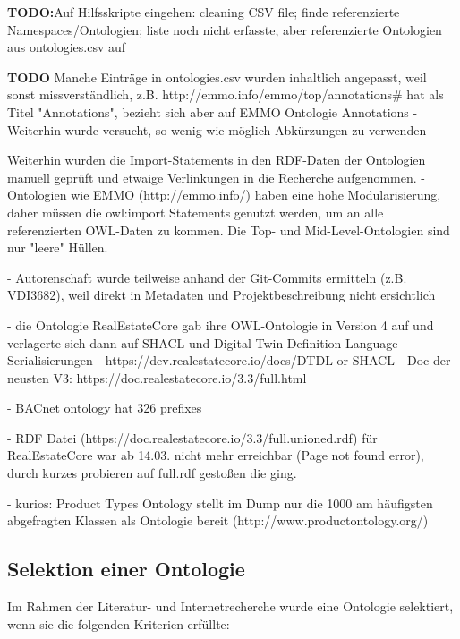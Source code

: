 \documentclass{article}
\begin{document}
\textbf{TODO:}Auf Hilfsskripte eingehen: cleaning CSV file; finde referenzierte Namespaces/Ontologien; liste noch nicht erfasste, aber referenzierte Ontologien aus ontologies.csv auf

\textbf{TODO} Manche Einträge in ontologies.csv wurden inhaltlich angepasst, weil sonst missverständlich, z.B. http://emmo.info/emmo/top/annotations\# hat als Titel "Annotations", bezieht sich aber auf EMMO Ontologie Annotations
- Weiterhin wurde versucht, so wenig wie möglich Abkürzungen zu verwenden

Weiterhin wurden die Import-Statements in den RDF-Daten der Ontologien manuell geprüft und etwaige Verlinkungen in die Recherche aufgenommen.
- Ontologien wie EMMO (http://emmo.info/) haben eine hohe Modularisierung, daher müssen die owl:import Statements genutzt werden, um an alle referenzierten OWL-Daten zu kommen. Die Top- und Mid-Level-Ontologien sind nur "leere" Hüllen.

- Autorenschaft wurde teilweise anhand der Git-Commits ermitteln (z.B. VDI3682), weil direkt in Metadaten und Projektbeschreibung nicht ersichtlich

- die Ontologie RealEstateCore gab ihre OWL-Ontologie in Version 4 auf und verlagerte sich dann auf SHACL und Digital Twin Definition Language Serialisierungen
  - https://dev.realestatecore.io/docs/DTDL-or-SHACL
  - Doc der neusten V3: https://doc.realestatecore.io/3.3/full.html

- BACnet ontology hat 326 prefixes

- RDF Datei (https://doc.realestatecore.io/3.3/full.unioned.rdf) für RealEstateCore war ab 14.03. nicht mehr erreichbar (Page not found error),
  durch kurzes probieren auf full.rdf gestoßen die ging.

- kurios: Product Types Ontology stellt im Dump nur die 1000 am häufigsten abgefragten Klassen als Ontologie bereit (http://www.productontology.org/)

\subsection{Selektion einer Ontologie}

Im Rahmen der Literatur- und Internetrecherche wurde eine Ontologie selektiert, wenn sie die folgenden Kriterien erfüllte:
\end{document}
